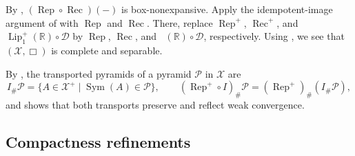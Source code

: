 \documentclass{amsart}
\theoremstyle{plain}
\theoremstyle{definition}
\theoremstyle{remark}
\newcommand{\R}{\mathbb{R}}
\newcommand{\D}{\mathcal{D}}
\newcommand{\X}{\mathcal{X}}
\newcommand{\Xp}{\mathcal{X}^{+}}
\newcommand{\Lup}{\operatorname{Lip}^{+}_{1}(\R)}
\DeclareMathOperator{\lipone}{Lip_1}
\begin{document}
By , $(\operatorname{Rep}\circ\operatorname{Rec})(-)$ is box-nonexpansive. Apply the idempotent-image argument of  with $\operatorname{Rep}$ and $\operatorname{Rec}$. There, replace $\operatorname{Rep}^{+}$, $\operatorname{Rec}^{+}$, and $\Lup\circ\D$ by $\operatorname{Rep}$, $\operatorname{Rec}$, and $\lipone(\R)\circ\D$, respectively. Using \cite[Theorem~4.10]{gds2}, we see that $(\X,\Box)$ is complete and separable.

By , the transported pyramids of a pyramid $\mathcal P$ in $\X$ are
\[
I_{\#}\mathcal P=\{A\in\Xp\mid\operatorname{Sym}(A)\in\mathcal P\},\qquad
(\operatorname{Rep}^{+}\circ I)_{\#}\mathcal P=(\operatorname{Rep}^{+})_{\#}(I_{\#}\mathcal P),
\]
and  shows that both transports preserve and reflect weak convergence.

\subsection{Compactness refinements}
\label{subsec:appendix-compactness-refinements}
\end{document}
